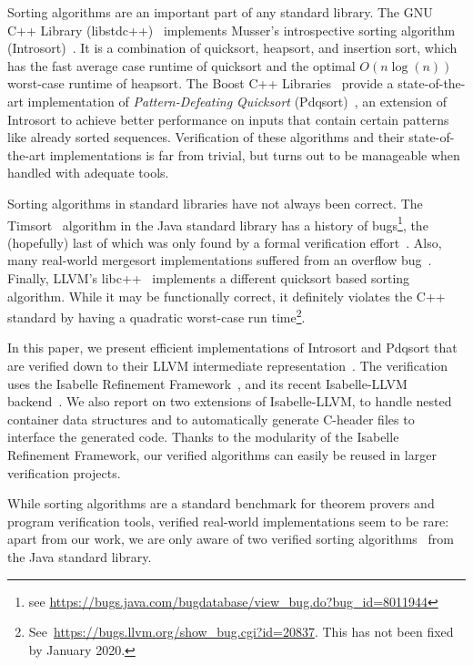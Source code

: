 \documentclass[runningheads]{llncs}
\begin{document}
  Sorting algorithms are an important part of any standard library.
  The GNU C++ Library (libstdc++)~\cite{libstdc++} implements Musser's introspective sorting algorithm (Introsort)~\cite{Muss97}.
  It is a combination of quicksort, heapsort, and insertion sort,
  which has the fast average case runtime of quicksort and the optimal $O(n\log(n))$
  worst-case runtime of heapsort.
  The Boost C++ Libraries~\cite{boost} provide a state-of-the-art implementation of
  \emph{Pattern-Defeating Quicksort} (Pdqsort)~\cite{pdqsort}, an extension of Introsort to
  achieve better performance on inputs that contain certain patterns like already sorted sequences.
  Verification of these algorithms and their state-of-the-art implementations is far from trivial,
  but turns out to be manageable when handled with adequate tools.

  Sorting algorithms in standard libraries have not always been correct.
  The Timsort~\cite{Peters02} algorithm in the Java standard library has a history of bugs\footnote{see \url{https://bugs.java.com/bugdatabase/view_bug.do?bug_id=8011944}}, the (hopefully) last of which was only found by a formal verification effort~\cite{GRBBH15}.
  Also, many real-world mergesort implementations suffered from an overflow bug~\cite{bs_flaw_blogpost}.
  Finally, LLVM's libc++~\cite{libc++} implements a different quicksort based sorting algorithm. While it may be functionally correct,
  it definitely violates the C++ standard by having a quadratic worst-case run time\footnote{See~\url{https://bugs.llvm.org/show_bug.cgi?id=20837}. This has not been fixed by January 2020.}.

  In this paper, we present efficient implementations of Introsort and Pdqsort that are verified down to their
  LLVM intermediate representation~\cite{LLVM-manual}. The verification uses the
  Isabelle Refinement Framework~\cite{LaTu12}, and its recent Isabelle-LLVM backend~\cite{La19-llvm}.
  We also report on two extensions of Isabelle-LLVM, to handle nested container data structures and to automatically
  generate C-header files to interface the generated code. Thanks to the modularity of the Isabelle Refinement Framework,
  our verified algorithms can easily be reused in larger verification projects.

  While sorting algorithms are a standard benchmark for theorem provers and program verification tools,
  verified real-world implementations seem to be rare: apart from our work, we are only aware of
  two verified sorting algorithms~\cite{GRBBH15,BSSU17} from the Java standard library.
\end{document}
